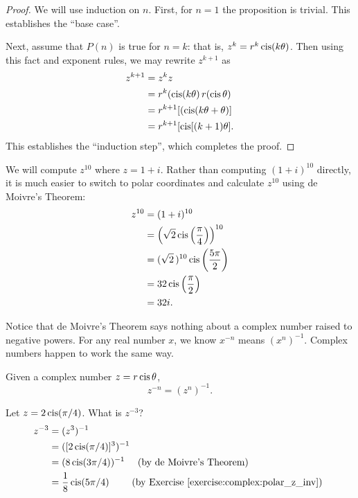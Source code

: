 \newline
\begin{proof}
We will use induction  on $n$. First, for $n=1$ the proposition
is trivial. This establishes the ``base case''. 

Next, assume that $P(n)$ is true for $n=k$: that is, 
$z^k = r^k \operatorname{cis}(k \theta)$. Then using this fact and exponent rules, we may rewrite $z^{k+1}$ as
\begin{align*}
z^{k+1} & =z^{k}z\\
 & =r^{k}(\operatorname{cis}(k\theta)\,r(\operatorname{cis}\theta)\\
 & =r^{k+1}[(\operatorname{cis}(k\theta + \theta)]\\
 & =r^{k+1}[\operatorname{cis}[(k+1)\theta].
\end{align*}
This establishes the ``induction step'', which completes the proof.
\end{proof}

\begin{example}\label{example:complex:DeMoivre} We will compute $z^{10}$ where $z=1+i$. Rather than computing $(1+i)^{10}$ directly, it
is much easier to switch to polar coordinates and calculate $z^{10}$
using de Moivre's Theorem: \begin{align*}
z^{10} & =(1+i)^{10}\\
 & =\left(\sqrt{2}\operatorname{cis}\left(\frac{\pi}{4}\right)\right)^{10}\\
 & =(\sqrt{2}\,)^{10}\operatorname{cis}\left(\frac{5\pi}{2}\right)\\
 & =32\operatorname{cis}\left(\frac{\pi}{2}\right)\\
 & =32i.\end{align*}
 \end{example}
 
\noindent
Notice that de Moivre's Theorem says nothing about a complex number raised to negative powers.  For any real number $x$, we know $x^{-n}$ means $(x^n)^{-1}$.  Complex numbers happen to work the same way.
 
 \begin{defn} \label{polar_negpower}
 Given a complex number $z=r\operatorname{cis}\theta$, 
 \[ z^{-n} = (z^n)^{-1}. \]
 \end{defn}
 
 \begin{example}\label{example:complex:5}
Let $z = 2\operatorname{cis}(\pi/4)$.  What is $z^{-3}$?  
 \begin{align*}
  z^{-3} & = (z^3)^{-1} \\
  & = ([2\cis(\pi/4)]^3)^{-1} \\
  & = (8\cis(3\pi/4))^{-1} \quad \mbox{ (by de Moivre's Theorem) } \\
  & = \frac{1}{8}\cis(5\pi/4) \qquad \mbox{ (by Exercise~\ref{exercise:complex:polar_z_inv}) } 
  \end{align*}
  \end{example}
 

